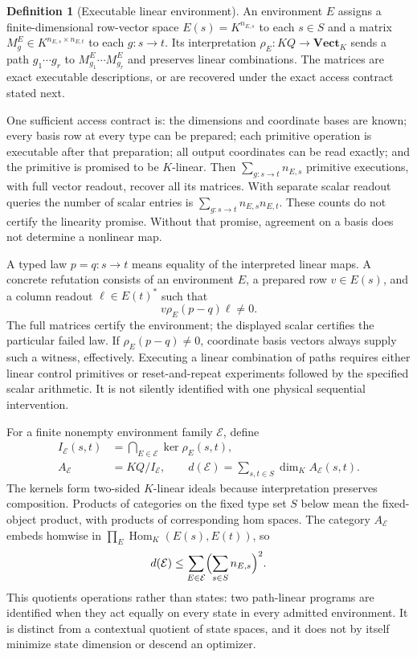 \documentclass[11pt]{article}
\theoremstyle{definition}
\newtheorem{definition}[theorem]{Definition}
\theoremstyle{remark}\newtheorem{remark}[theorem]{Remark}
\begin{document}
\begin{definition}[Executable linear environment]
An environment $E$ assigns a finite-dimensional row-vector space
$E(s)=K^{n_{E,s}}$ to each $s\in S$ and a matrix
$M^E_g\in K^{n_{E,s}\times n_{E,t}}$ to each $g:s\to t$.
Its interpretation $\rho_E:KQ\to\mathbf{Vect}_K$ sends a path
$g_1\cdots g_r$ to $M^E_{g_1}\cdots M^E_{g_r}$ and preserves linear
combinations. The matrices are exact executable descriptions, or are
recovered under the exact access contract stated next.
\end{definition}

One sufficient access contract is: the dimensions and coordinate bases
are known; every basis row at every type can be prepared; each primitive
operation is executable after that preparation; all output coordinates
can be read exactly; and the primitive is promised to be $K$-linear.
Then $\sum_{g:s\to t}n_{E,s}$ primitive executions, with full vector
readout, recover all its matrices. With separate scalar readout queries
the number of scalar entries is
$\sum_{g:s\to t}n_{E,s}n_{E,t}$.
These counts do not certify the linearity promise. Without that promise,
agreement on a basis does not determine a nonlinear map.

A typed law $p=q:s\to t$ means equality of the interpreted linear maps.
A concrete refutation consists of an environment $E$, a prepared row
$v\in E(s)$, and a column readout $\ell\in E(t)^*$ such that
\begin{equation}\label{ef:eq:witness}
             v\rho_E(p-q)\ell\ne0.
\end{equation}
The full matrices certify the environment; the displayed scalar certifies
the particular failed law. If $\rho_E(p-q)\ne0$, coordinate basis vectors
always supply such a witness, effectively. Executing a linear combination
of paths requires either linear control primitives or reset-and-repeat
experiments followed by the specified scalar arithmetic. It is not
silently identified with one physical sequential intervention.

For a finite nonempty environment family $\mathcal E$, define
\begin{align}
 I_{\mathcal E}(s,t)&=\bigcap_{E\in\mathcal E}\ker\rho_E(s,t),\\
 A_{\mathcal E}&=KQ/I_{\mathcal E},\qquad
 d(\mathcal E)=\sum_{s,t\in S}\dim_K A_{\mathcal E}(s,t).
 \label{ef:eq:quotient}
\end{align}
The kernels form two-sided $K$-linear ideals because interpretation
preserves composition. Products of categories on the fixed type set $S$
below mean the fixed-object product, with products of corresponding hom
spaces. The category $A_{\mathcal E}$ embeds homwise in
$\prod_E\operatorname{Hom}_K(E(s),E(t))$, so
\begin{equation}\label{ef:eq:dimension}
 d(\mathcal E)\leq
 \sum_{E\in\mathcal E}\Bigl(\sum_{s\in S}n_{E,s}\Bigr)^2.
\end{equation}
This quotients operations rather than states: two path-linear programs
are identified when they act equally on every state in every admitted
environment. It is distinct from a contextual quotient of state spaces,
and it does not by itself minimize state dimension or descend an optimizer.
\end{document}
